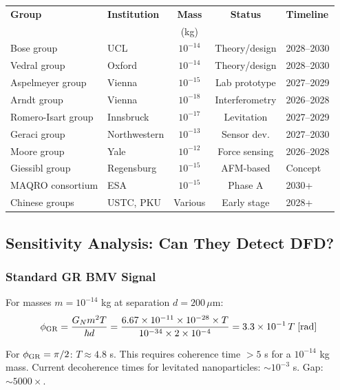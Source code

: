 \documentclass[11pt,a4paper]{article}
\begin{document}
\begin{center}
\begin{longtable}{llccl}
\toprule
\textbf{Group} & \textbf{Institution} & \textbf{Mass} & \textbf{Status} & \textbf{Timeline} \\
 & & (kg) & & \\
\midrule
\endhead
Bose group & UCL & $10^{-14}$ & Theory/design & 2028--2030 \\
Vedral group & Oxford & $10^{-14}$ & Theory/design & 2028--2030 \\
Aspelmeyer group & Vienna & $10^{-15}$ & Lab prototype & 2027--2029 \\
Arndt group & Vienna & $10^{-18}$ & Interferometry & 2026--2028 \\
Romero-Isart group & Innsbruck & $10^{-17}$ & Levitation & 2027--2029 \\
Geraci group & Northwestern & $10^{-13}$ & Sensor dev. & 2027--2030 \\
Moore group & Yale & $10^{-12}$ & Force sensing & 2026--2028 \\
Giessibl group & Regensburg & $10^{-15}$ & AFM-based & Concept \\
MAQRO consortium & ESA & $10^{-15}$ & Phase A & 2030+ \\
Chinese groups & USTC, PKU & Various & Early stage & 2028+ \\
\bottomrule
\end{longtable}
\end{center}

\subsection{Sensitivity Analysis: Can They Detect DFD?}

\subsubsection{Standard GR BMV Signal}

For masses $m = 10^{-14}$ kg at separation $d = 200\,\mu$m:
\begin{equation}
\phi_{\rm GR} = \frac{G_N m^2 T}{\hbar d} = \frac{6.67\times10^{-11}\times10^{-28}\times T}{10^{-34}\times2\times10^{-4}} = 3.3\times10^{-1}\,T\;\text{[rad]}
\end{equation}

For $\phi_{\rm GR} = \pi/2$: $T \approx 4.8$ s. This requires coherence time $> 5$ s for a $10^{-14}$ kg mass. Current decoherence times for levitated nanoparticles: $\sim 10^{-3}$ s. Gap: $\sim 5000\times$.
\end{document}
